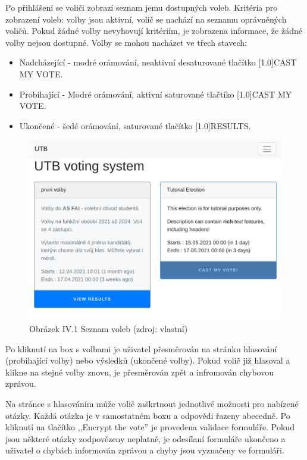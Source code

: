 Po přihlášení se voliči zobrazí seznam jemu dostupných voleb. Kritéria pro zobrazení voleb: volby jsou aktivní, volič se nachází na seznamu oprávněných voličů. Pokud žádné volby nevyhovují kritériím, je zobrazena informace, že žádné volby nejsou dostupné. Volby se mohou nacházet ve třech stavech: 
\begin{itemize}
	\item Nadcházející - modré orámování, neaktivní desaturované tlačítko \scalebox{.7}[1.0]{\textsf{CAST MY VOTE}}.
	\item Probíhající - Modré orámování, aktivní saturované tlačtíko \scalebox{.7}[1.0]{\textsf{CAST MY VOTE}}.
	\item Ukončené - šedé orámování, saturované tlačítko \scalebox{.7}[1.0]{\textsf{RESULTS}}.
\end{itemize}
\begin{figure}[h]
	\centering
	\includegraphics[width=\linewidth]{graphics/attachements/volbyPrehledDouble.png}
	\captionsetup{width=\linewidth}
	\caption*{Obrázek IV.1 Seznam voleb (zdroj: vlastní)}
\end{figure}
\clearpage
Po kliknutí na box s volbami je uživatel přesměrován na stránku hlasování (probíhající volby) nebo výsledků (ukončené volby). Pokud volič již hlasoval a klikne na stejné volby znovu, je přesměrován zpět a infromován chybovou zprávou.

Na stránce s hlasováním může volič zaškrtnout jednotlivé možnosti pro nabízené otázky. Každá otázka je v samostatném boxu a odpovědi řazeny abecedně. Po kliknutí na tlačítko ,,Encrypt the vote'' je provedena validace formuláře. Pokud jsou některé otázky zodpovězeny neplatně, je odesílaní formuláře ukončeno a uživatel o chybách informován zprávou a chyby jsou vyznačeny ve formuláři.

